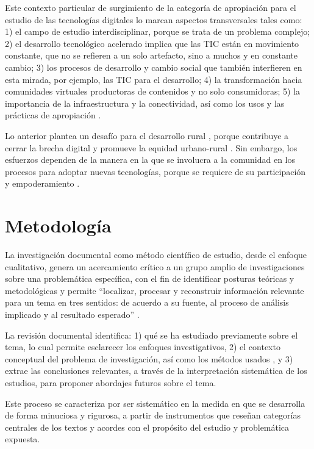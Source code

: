 \documentclass[spanish]{textolivre}
\begin{document}
Este contexto particular de surgimiento de la categoría de apropiación para el estudio de las tecnologías digitales lo marcan aspectos transversales tales como: 1) el campo de estudio interdisciplinar, porque se trata de un problema complejo; 2) el desarrollo tecnológico acelerado implica que las TIC están en movimiento constante, que no se refieren a un solo artefacto, sino a muchos y en constante cambio; 3) los procesos de desarrollo y cambio social que también interfieren en esta mirada, por ejemplo, las TIC para el desarrollo; 4) la transformación hacia comunidades virtuales productoras de contenidos y no solo consumidoras; 5) la importancia de la infraestructura y la conectividad, así como los usos y las prácticas de apropiación \cite{rivoir_reflexiones_2017}. 

Lo anterior plantea un desafío para el desarrollo rural \cite{alavion_rural_2020}, porque contribuye a cerrar la brecha digital y promueve la equidad urbano-rural \cite{ye_citizen-led_2021}. Sin embargo, los esfuerzos dependen de la manera en la que se involucra a la comunidad en los procesos para adoptar nuevas tecnologías, porque se requiere de su participación y empoderamiento \cite{matsenjwa_pro-poor_2019}. 

\section{Metodología}\label{sec-modelo}

La investigación documental como método científico de estudio, desde el enfoque cualitativo, genera un acercamiento crítico a un grupo amplio de investigaciones sobre una problemática específica, con el fin de identificar posturas teóricas y metodológicas \cite{gomez_vargas_estado_2015} y permite “localizar, procesar y reconstruir información relevante para un tema en tres sentidos: de acuerdo a su fuente, al proceso de análisis implicado y al resultado esperado” \cite[p.~3]{izaguirre_remon_revision_nodate}.

La revisión documental identifica: 1) qué se ha estudiado previamente sobre el tema, lo cual permite esclarecer los enfoques investigativos, 2) el contexto conceptual del problema de investigación, así como los métodos usados \cite{izaguirre_remon_revision_nodate}, y 3) extrae las conclusiones relevantes, a través de la interpretación sistemática de los estudios, para proponer abordajes futuros sobre el tema. 

Este proceso se caracteriza por ser sistemático en la medida en que se desarrolla de forma minuciosa y rigurosa, a partir de instrumentos que reseñan categorías centrales de los textos y acordes con el propósito del estudio y problemática expuesta.
\end{document}
